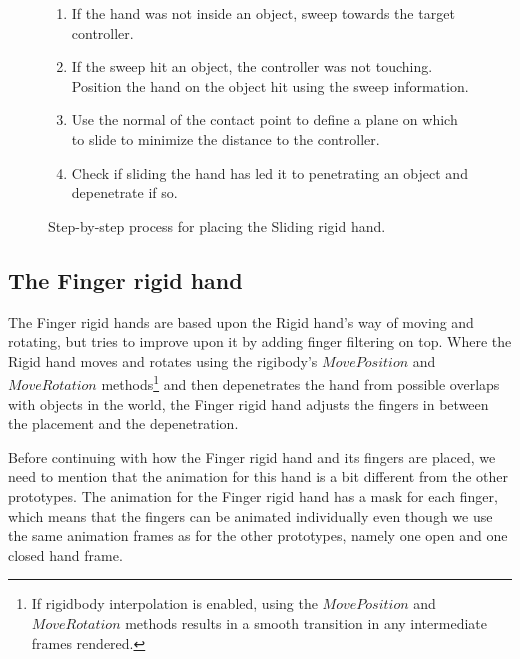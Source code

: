\begin{figure}[H]
\begin{minipage}[t]{0.49\textwidth}
\begin{enumerate}[noitemsep]
\item If the hand was not inside an object, sweep towards the target controller.
\item If the sweep hit an object, the controller was not touching. Position the hand on the object hit using the sweep information.
\item Use the normal of the contact point to define a plane on which to slide to minimize the distance to the controller.
\item Check if sliding the hand has led it to penetrating an object and depenetrate if so.
\end{enumerate}
\end{minipage}
\caption{Step-by-step process for placing the Sliding rigid hand.}
\label{fig:stepByStepSlidingRigidHand}
\end{figure}



\subsection{The Finger rigid hand}
\label{subsec:slidingRigidHand}
The Finger rigid hands are based upon the Rigid hand's way of moving and rotating, but tries to improve upon it by adding finger filtering on top. Where the Rigid hand moves and rotates using the rigibody's $MovePosition$ and $MoveRotation$ methods\footnote{If rigidbody interpolation is enabled, using the $MovePosition$ and $MoveRotation$ methods results in a smooth transition in any intermediate frames rendered.} and then depenetrates the hand from possible overlaps with objects in the world, the Finger rigid hand adjusts the fingers in between the placement and the depenetration.

Before continuing with how the Finger rigid hand and its fingers are placed, we need to mention that the animation for this hand is a bit different from the other prototypes. The animation for the Finger rigid hand has a mask for each finger, which means that the fingers can be animated individually even though we use the same animation frames as for the other prototypes, namely one open and one closed hand frame.

